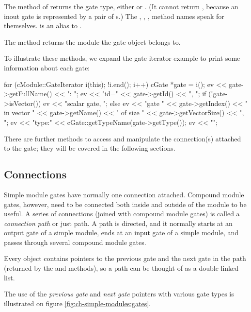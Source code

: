 The  method of  returns the gate type,
either  or . (It cannot return
, because an inout gate is represented by a pair
of s.) The , ,
,  method names speak for themselves.
 is an alias to .

The  method returns the module the gate object
belongs to.

To illustrate these methods, we expand the gate iterator example
to print some information about each gate:

\begin{cpp}
for (cModule::GateIterator i(this); !i.end(); i++) {
    cGate *gate = i();
    ev << gate->getFullName() << ": ";
    ev << "id=" << gate->getId() << ", ";
    if (!gate->isVector())
        ev << "scalar gate, ";
    else
        ev << "gate " << gate->getIndex()
           << " in vector " << gate->getName()
           << " of size " << gate->getVectorSize() << ", ";
    ev << "type:" << cGate::getTypeName(gate->getType());
    ev << "\n";
}
\end{cpp}

There are further  methods to access and manipulate
the connection(s) attached to the gate; they will be covered in the
following sections.


\subsection{Connections}
\label{sec:simple-modules:connections}

Simple module gates have normally one connection attached. Compound module
gates, however, need to be connected both inside and outside of the
module to be useful. A series of connections (joined with compound
module gates) is called a \textit{connection path} or just path.
A path is directed, and it normally starts at an output gate of
a simple module, ends at an input gate of a simple module,
and passes through several compound module gates.

Every  object contains pointers to the previous gate
and the next gate in the path (returned by the 
and  methods), so a path can be thought of as
a double-linked list.

The use of the \textit{previous gate} and \textit{next gate} pointers
with various gate types is illustrated on figure
\ref{fig:ch-simple-modules:gates}.

